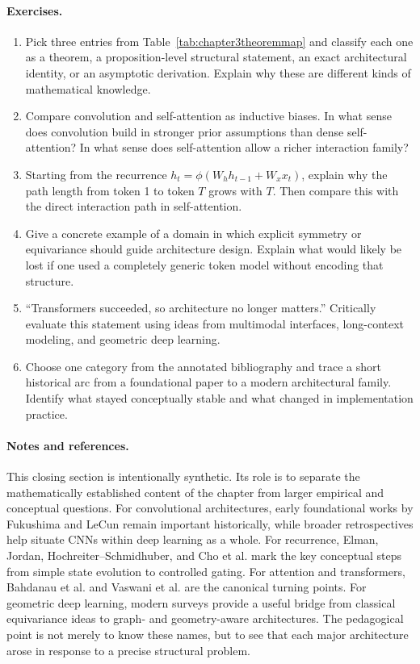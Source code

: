 \paragraph{Exercises.}
\begin{enumerate}
    \item Pick three entries from Table~\ref{tab:chapter3theoremmap} and classify each one as a theorem, a proposition-level structural statement, an exact architectural identity, or an asymptotic derivation.
    Explain why these are different kinds of mathematical knowledge.
    \item Compare convolution and self-attention as inductive biases.
    In what sense does convolution build in stronger prior assumptions than dense self-attention?
    In what sense does self-attention allow a richer interaction family?
    \item Starting from the recurrence
    \(h_t = \phi(W_h h_{t-1}+W_x x_t)\), explain why the path length from token 1 to token \(T\) grows with \(T\).
    Then compare this with the direct interaction path in self-attention.
    \item Give a concrete example of a domain in which explicit symmetry or equivariance should guide architecture design.
    Explain what would likely be lost if one used a completely generic token model without encoding that structure.
    \item ``Transformers succeeded, so architecture no longer matters.''
    Critically evaluate this statement using ideas from multimodal interfaces, long-context modeling, and geometric deep learning.
    \item Choose one category from the annotated bibliography and trace a short historical arc from a foundational paper to a modern architectural family.
    Identify what stayed conceptually stable and what changed in implementation practice.
\end{enumerate}

\paragraph{Notes and references.}
This closing section is intentionally synthetic.
Its role is to separate the mathematically established content of the chapter from larger empirical and conceptual questions.
For convolutional architectures, early foundational works by Fukushima and LeCun remain important historically, while broader retrospectives help situate CNNs within deep learning as a whole.
For recurrence, Elman, Jordan, Hochreiter--Schmidhuber, and Cho et al. mark the key conceptual steps from simple state evolution to controlled gating.
For attention and transformers, Bahdanau et al.
and Vaswani et al.
are the canonical turning points.
For geometric deep learning, modern surveys provide a useful bridge from classical equivariance ideas to graph- and geometry-aware architectures.
The pedagogical point is not merely to know these names, but to see that each major architecture arose in response to a precise structural problem.

